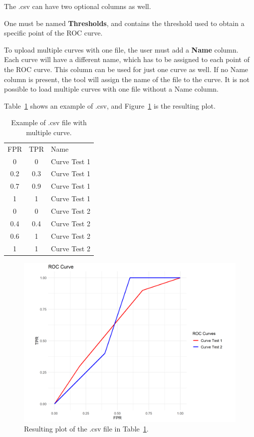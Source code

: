 \documentclass{article}
\begin{document}
	 The .csv can have two optional columns as well. 
	 
	 One must be named \textbf{Thresholds}, and contains the threshold used to obtain a specific point of the ROC curve.
	 
	 To upload multiple curves with one file, the user must add a \textbf{Name} column. Each curve will have a different name, which has to be assigned to each point of the ROC curve. This column can be used for just one curve as well. 
	 If no Name column is present, the tool will assign the name of the file to the curve. It is not possible to load multiple curves with one file without a Name column.
	 
	 Table~\ref{tab:csvExample} shows an example of .csv, and Figure~\ref{fig:examplePlots} is the resulting plot. 
	 
	 \begin{table}[h!]
	 	\centering
	 	\label{tab:csvExample}
	 	\caption{Example of .csv file with multiple curve.}
	 	\begin{tabular}{ccl}
	 		FPR & TPR & Name         \\
	 		0   & 0   & Curve Test 1 \\
	 		0.2 & 0.3 & Curve Test 1 \\
	 		0.7 & 0.9 & Curve Test 1 \\
	 		1   & 1   & Curve Test 1 \\
	 		0   & 0   & Curve Test 2 \\
	 		0.4 & 0.4 & Curve Test 2 \\
	 		0.6 & 1   & Curve Test 2 \\
	 		1   & 1   & Curve Test 2
	 	\end{tabular}
	 \end{table}
	 
	 \begin{figure}[h!]
	 	\centering
	 	\caption{Resulting plot of the .csv file in Table~\ref{tab:csvExample}.}
	 	\label{fig:examplePlots}
	 	\includegraphics[width=1\linewidth]{Figures/roc_plot_1.png}
	 \end{figure}
	 
\end{document}

